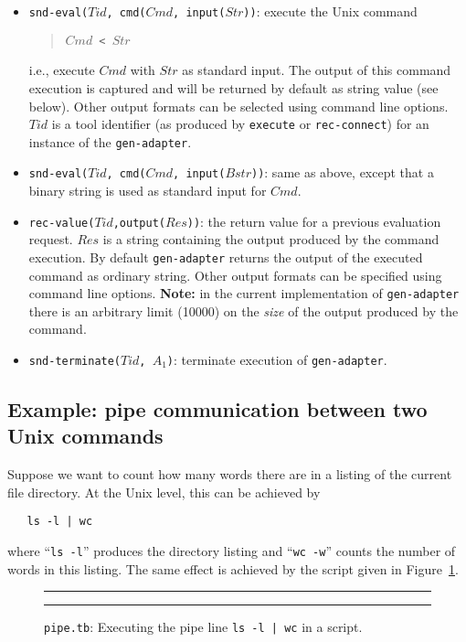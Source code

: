 \begin{itemize}
\item {\tt snd-eval($Tid$, cmd($Cmd$, input($Str$))}: execute the Unix command
\begin{quote}
	{\tt $Cmd$ < $Str$}
\end{quote}
i.e., execute $Cmd$ with $Str$ as standard input. The output of this command execution
is captured and will be returned by default as string value (see below).
Other output formats can be selected using command line options.
$Tid$ is a tool identifier 
(as produced by {\tt execute} or {\tt rec-connect}) for an instance of the {\tt gen-adapter}.

\item {\tt snd-eval($Tid$, cmd($Cmd$, input($Bstr$))}: same as above, except that
a binary string is used as standard input for $Cmd$.

\item {\tt rec-value($Tid$,output($Res$))}: the return value for a previous evaluation request.
$Res$ is a string containing the output produced by the command execution.
By default \texttt{gen-adapter} returns the output of the executed command
as ordinary string. Other output formats can be specified using command line
options. {\bf Note:} in the current implementation of {\tt gen-adapter}
there is an arbitrary limit (10000) on the {\em size} of the output produced
by the command.

\item {\tt snd-terminate($Tid$, $A_1$)}: terminate execution of {\tt gen-adapter}.
\end{itemize}

\subsection{\label{Ex-pipe}Example: pipe communication between two Unix commands}
Suppose we want to count how many words there are in a listing of the
current file directory. At the Unix level, this can be achieved by
\begin{verbatim}
   ls -l | wc
\end{verbatim}
where ``{\tt ls -l}'' produces the directory listing and
``{\tt wc -w}'' counts the number of words in this listing.
The same effect is achieved by the script given in Figure~\ref{fig:pipe.tb}.

\begin{figure}
\rule{\textwidth}{0.5mm}

  \caption{{\tt pipe.tb}: Executing the pipe line {\tt ls -l | wc} in a script.}
  \label{fig:pipe.tb}
\rule{\textwidth}{0.5mm}
\end{figure}
